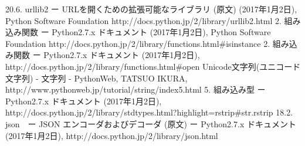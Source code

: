 \documentclass[a4paper,10pt,onecolumn,oneside,openany]{jsbook}
\begin{document}
\begin{thebibliography}{21}
 20.6. urllib2 ー URLを開くための拡張可能なライブラリ (原文) (2017年1月2日), Python Software Foundation http://docs.python.jp/2/library/urllib2.html
 2. 組み込み関数 ー Python2.7.x ドキュメント (2017年1月2日), Python Software Foundation http://docs.python.jp/2/library/functions.html\#isinstance
 2. 組み込み関数 ー Python2.7.x ドキュメント (2017年1月2日), http://docs.python.jp/2/library/functions.html\#open
 Unicode文字列(ユニコード文字列) - 文字列 - PythonWeb, TATSUO IKURA, http://www.pythonweb.jp/tutorial/string/index5.html
 5. 組み込み型 ー Python2.7.x ドキュメント (2017年1月2日), http://docs.python.jp/2/library/stdtypes.html?highlight=rstrip\#str.rstrip
 18.2. json　ー JSON エンコーダおよびデコーダ (原文) ー Python2.7.x ドキュメント (2017年1月2日), http://docs.python.jp/2/library/json.html




\end{thebibliography}

\newpage
\appendix
\chapter{}

\newpage



\newpage



\newpage
\printindex
%
%
\end{document}
